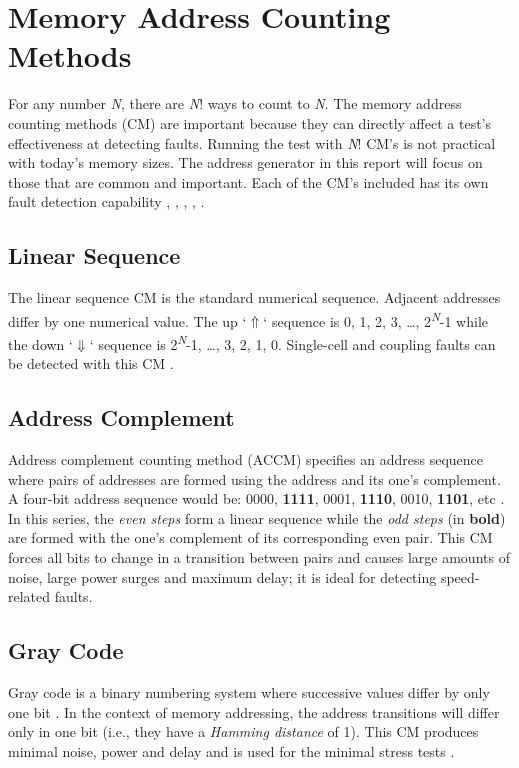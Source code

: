 \section{Memory Address Counting Methods}
\label{sect:bg-counting}
For any number \textit{N}, there are \textit{N}! ways to count to \textit{N}.  The memory address counting methods (CM) are important because they can directly affect a test's effectiveness at detecting faults.  Running the test with \textit{N}! CM's is not practical with today's memory sizes.  The address generator in this report will focus on those that are common and important.  Each of the CM's included has its own fault detection capability \cite{1347645}, \cite{990255}, \cite{1584048}, \cite{5359299}, \cite{1576336}.

\subsection{Linear Sequence}
The linear sequence CM is the standard numerical sequence.  Adjacent addresses differ by one numerical value.  The up `$\Uparrow$` sequence is 0, 1, 2, 3, \ldots, 2\textsuperscript{\textit{N}}-1 while the down `$\Downarrow$` sequence is 2\textsuperscript{\textit{N}}-1, \ldots, 3, 2, 1, 0.  Single-cell and coupling faults can be detected with this CM \cite{5941430}.

\subsection{Address Complement}
Address complement counting method (ACCM) specifies an address sequence where pairs of addresses are formed using the address and its one's complement.  A four-bit address sequence would be: 0000, \textbf{1111}, 0001, \textbf{1110}, 0010, \textbf{1101}, etc \cite{VanDeGoor1991}.  In this series, the \textit{even steps} form a linear sequence while the \textit{odd steps} (in \textbf{bold}) are formed with the one's complement of its corresponding even pair.  This CM forces all bits to change in a transition between pairs and causes large amounts of noise, large power surges and maximum delay; it is ideal for detecting speed-related faults.

\subsection{Gray Code}
Gray code is a binary numbering system where successive values differ by only one bit \cite{VanDeGoor1991}.  In the context of memory addressing, the address transitions will differ only in one bit (i.e., they have a \textit{Hamming distance} of 1).  This CM produces minimal noise, power and delay and is used for the minimal stress tests \cite{5941430}.

